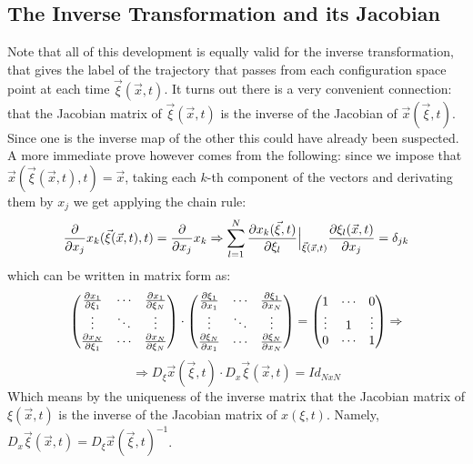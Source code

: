 \documentclass[11pt, a4paper]{article} %
\begin{document}
\subsection*{ The Inverse Transformation and its Jacobian\vspace{-0.2cm}}
Note that all of this development is equally valid for the inverse transformation, that gives the label of the trajectory that passes from each configuration space point at each time $\vec{\xi}(\vec{x},t)$. It turns out there is a very convenient connection: that the Jacobian matrix of $\vec{\xi}(\vec{x},t)$ is the inverse of the Jacobian of $\vec{x}(\vec{\xi},t)$. Since one is the inverse map of the other this could have already been suspected. A more immediate prove however comes from the following: since we impose that $\vec{x}(\vec{\xi}(\vec{x},t),t)=\vec{x}$, taking each $k$-th component of the vectors and derivating them by $x_j$ we get applying the chain rule:
\begin{equation}
\pdv{}{x_j}x_k(\vec{\xi}(\vec{x},t),t)=\pdv{}{x_j}x_k \Rightarrow \sum_{l=1}^N \pdv{x_k(\vec{\xi},t)}{\xi_l}\Big\rvert_{\vec{\xi}(\vec{x},t)}\pdv{\xi_l(\vec{x},t)}{x_j}=\delta_{jk}
\end{equation}
which can be written in matrix form as:
\begin{equation}\label{inverse}
\begin{pmatrix}
\pdv{x_1}{\xi_1}&\cdots&\pdv{x_1}{\xi_N} \\
\vdots &\ddots& \vdots \\
\pdv{x_N}{\xi_1}&\cdots&\pdv{x_N}{\xi_N}
\end{pmatrix}\cdot \begin{pmatrix}
\pdv{\xi_1}{x_1}&\cdots&\pdv{\xi_1}{x_N} \\
\vdots & \ddots & \vdots \\
\pdv{\xi_N}{x_1}&\cdots&\pdv{\xi_N}{x_N}
\end{pmatrix}=\begin{pmatrix}
1&\cdots &0 \\
\vdots & 1& \vdots \\
0&\cdots &1
\end{pmatrix}\Rightarrow
\end{equation}
$$
\Rightarrow D_\xi \vec{x}(\vec{\xi},t)\cdot D_x \vec{\xi}(\vec{x},t) = Id_{NxN}
$$
Which means by the uniqueness of the inverse matrix that the Jacobian matrix of $\xi(\vec{x},t)$ is the inverse of the Jacobian matrix of $x(\xi,t)$. Namely, $D_x \vec{\xi}(\vec{x},t)=D_\xi \vec{x}(\vec{\xi},t)^{-1}$.
\end{document}
